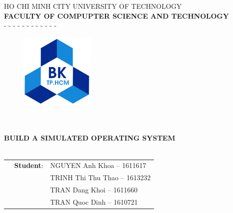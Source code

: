 \documentclass[]{article}
\date{}
\begin{document}
\begin{titlepage}
\vspace{0cm}
\begin{center}
HO CHI MINH CITY UNIVERSITY OF TECHNOLOGY \\
\textbf{FACULTY OF COMPUPTER SCIENCE AND TECHNOLOGY} \\
- - - - - - - - - - - -
\end{center}


\vspace{1cm}
\begin{figure}[h!]
\begin{center}
\includegraphics[width=3.6cm]{hcmut.png}
\end{center}
\end{figure}
\vspace{1cm}



\begin{center}
\begin{tabular}
\\
\hline
\\
\textbf{{\Large BUILD A SIMULATED OPERATING SYSTEM}} \\


\\
\hline
\end{tabular}
\end{center}

\begin{table}[h]
\begin{tabular}{rrl}
\hspace{5cm} & \textbf{Student}: & NGUYEN Anh Khoa -- 1611617 \\
& & TRINH Thi Thu Thao -- 1613232 \\
& & TRAN Dang Khoi -- 1611660 \\
& & TRAN Quoc Dinh -- 1610721


\end{tabular}
\end{table}
\end{titlepage}
\end{document}
